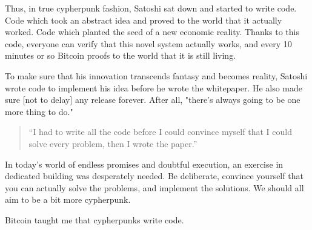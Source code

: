 Thus, in true cypherpunk fashion, Satoshi sat down and started to write
code. Code which took an abstract idea and proved to the world that it
actually worked. Code which planted the seed of a new economic reality.
Thanks to this code, everyone can verify that this novel system actually
works, and every 10 minutes or so Bitcoin proofs to the world that it is
still living.


To make sure that his innovation transcends fantasy and becomes reality,
Satoshi wrote code to implement his idea before he wrote the whitepaper.
He also made sure [not to delay] any release forever. After all,
"there's always going to be one more thing to do."

\begin{quotation}
``I had to write all the code before I could convince myself that I
could solve every problem, then I wrote the paper.''
\end{quotation}

In today's world of endless promises and doubtful execution, an exercise
in dedicated building was desperately needed. Be deliberate, convince
yourself that you can actually solve the problems, and implement the
solutions. We should all aim to be a bit more cypherpunk.

Bitcoin taught me that cypherpunks write code.

%
%
%
%
